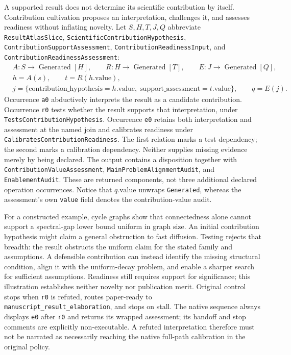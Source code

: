 A supported result does not determine its scientific contribution by itself.
Contribution cultivation proposes an interpretation, challenges it, and assesses
readiness without inflating novelty. Let $S,H,T,J,Q$ abbreviate
\texttt{Result\allowbreak Atlas\allowbreak Slice}, \texttt{Scientific\allowbreak Contribution\allowbreak Hypothesis},
\texttt{Contribution\allowbreak Support\allowbreak Assessment}, \texttt{Contribution\allowbreak Readiness\allowbreak Input},
and \texttt{Contribution\allowbreak Readiness\allowbreak Assessment}:
\[
\begin{aligned}
&A:S\to\operatorname{Generated}[H],\qquad
 R:H\to\operatorname{Generated}[T],\qquad
 E:J\to\operatorname{Generated}[Q],\\
&h=A(s),\qquad t=R(h.\mathrm{value}),\\
&j=\{\mathrm{contribution\_hypothesis}=h.\mathrm{value},\;
       \mathrm{support\_assessment}=t.\mathrm{value}\},\qquad q=E(j).
\end{aligned}
\]
Occurrence \texttt{a0} abductively interprets the result as a candidate
contribution. Occurrence \texttt{r0} tests whether the result supports that
interpretation, under \texttt{Tests\allowbreak Contribution\allowbreak Hypothesis}. Occurrence
\texttt{e0} retains both interpretation and assessment at the named join and
calibrates readiness under \texttt{Calibrates\allowbreak Contribution\allowbreak Readiness}. The first
relation marks a test dependency; the second marks a calibration dependency.
Neither supplies missing evidence merely by being declared. The output contains
a disposition together with \texttt{Contribution\allowbreak Value\allowbreak Assessment},
\texttt{Main\allowbreak Problem\allowbreak Alignment\allowbreak Audit}, and \texttt{Enablement\allowbreak Audit}. These are returned
components, not three additional declared operation occurrences. Notice that
$q.\mathrm{value}$ unwraps \texttt{Generated}, whereas the assessment's own
\texttt{value} field denotes the contribution-value audit.

For a constructed example, cycle graphs show that connectedness alone cannot
support a spectral-gap lower bound uniform in graph size. An initial contribution
hypothesis might claim a general obstruction to fast diffusion. Testing rejects
that breadth: the result obstructs the uniform claim for the stated family and
assumptions. A defensible contribution can instead identify the missing structural
condition, align it with the uniform-decay problem, and enable a sharper search
for sufficient assumptions. Readiness still requires support for significance;
this illustration establishes neither novelty nor publication merit.
Original control stops when \texttt{r0} is refuted, routes paper-ready to
\texttt{manuscript\_\allowbreak result\_\allowbreak elaboration}, and stops on stall. The native sequence
always displays \texttt{e0} after \texttt{r0} and returns its wrapped assessment;
its handoff and stop comments are explicitly non-executable. A refuted
interpretation therefore must not be narrated as necessarily reaching the native
full-path calibration in the original policy.



